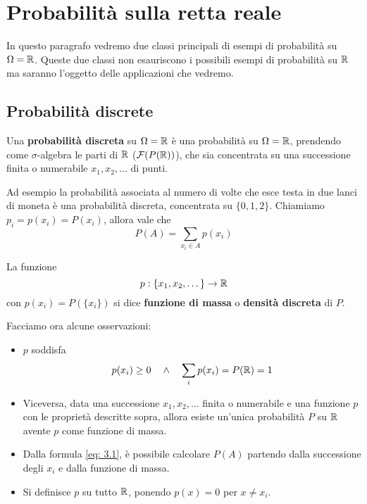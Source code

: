 \section{Probabilità sulla retta reale}
In questo paragrafo vedremo due classi principali di esempi di probabilità su $\Omega = \mathbb{R}$.
Queste due classi non esauriscono i possibili esempi di probabilità su $\mathbb{R}$ ma saranno l'oggetto
delle applicazioni che vedremo.

\subsection{Probabilità discrete}
Una \textbf{probabilità discreta} su $\Omega = \mathbb{R}$ è una probabilità su $\Omega = \mathbb{R}$, prendendo
come $\sigma$-algebra le parti di $\mathbb{R}$ ($\mathcal{F} (P(\mathbb{R}))$), che sia concentrata su una successione
finita o numerabile $x_1, x_2, \dots$ di punti.

Ad esempio la probabilità associata al numero di volte che esce testa in due lanci di moneta è
una probabilità discreta, concentrata su $\{0,1,2\}$. Chiamiamo $p_i = p(x_i) = P(x_i)$, allora
vale che
\begin{equation}\label{eq: 3.1} P(A) = \sum_{x_i \in A} p(x_i) \end{equation}

\begin{definition}
	La funzione
	\[ p : \{ x_1, x_2, \dots \} \to \mathbb{R} \]
	con $p(x_i) = P(\{x_i\})$ si dice \textbf{funzione di massa} o \textbf{densità discreta} di $P$.
\end{definition}

\begin{observation}
	Facciamo ora alcune osservazioni:
	\begin{itemize}
		\item $p$ soddisfa
		      \[ p(x_i) \geq 0 \quad \land \quad \sum_i p(x_i) = P(\mathbb{R}) = 1\]
		\item Viceversa, data una successione $x_1, x_2, \dots$ finita o numerabile e una funzione
		      $p$ con le proprietà descritte sopra, allora esiste un'unica probabilità $P$ su $\mathbb{R}$
		      avente $p$ come funzione di massa.
		\item Dalla formula \ref{eq: 3.1}, è possibile calcolare $P(A)$ partendo dalla successione
		      degli $x_i$ e dalla funzione di massa.
		\item Si definisce $p$ su tutto $\mathbb{R}$, ponendo $p(x) = 0$ per $x \neq x_i$.
	\end{itemize}
\end{observation}

